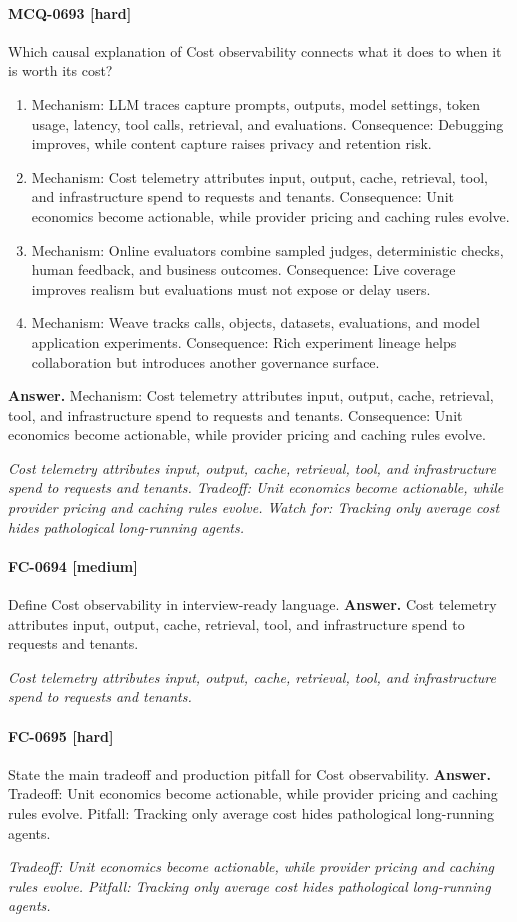 \paragraph{MCQ-0693 [hard]} Which causal explanation of Cost observability connects what it does to when it is worth its cost?
\begin{enumerate}[label=\Alph*.]
\item Mechanism: LLM traces capture prompts, outputs, model settings, token usage, latency, tool calls, retrieval, and evaluations. Consequence: Debugging improves, while content capture raises privacy and retention risk.
\item Mechanism: Cost telemetry attributes input, output, cache, retrieval, tool, and infrastructure spend to requests and tenants. Consequence: Unit economics become actionable, while provider pricing and caching rules evolve.
\item Mechanism: Online evaluators combine sampled judges, deterministic checks, human feedback, and business outcomes. Consequence: Live coverage improves realism but evaluations must not expose or delay users.
\item Mechanism: Weave tracks calls, objects, datasets, evaluations, and model application experiments. Consequence: Rich experiment lineage helps collaboration but introduces another governance surface.
\end{enumerate}
\noindent\textbf{Answer.} Mechanism: Cost telemetry attributes input, output, cache, retrieval, tool, and infrastructure spend to requests and tenants. Consequence: Unit economics become actionable, while provider pricing and caching rules evolve.
\par\textit{Cost telemetry attributes input, output, cache, retrieval, tool, and infrastructure spend to requests and tenants. Tradeoff: Unit economics become actionable, while provider pricing and caching rules evolve. Watch for: Tracking only average cost hides pathological long-running agents.}
\paragraph{FC-0694 [medium]} Define Cost observability in interview-ready language.
\noindent\textbf{Answer.} Cost telemetry attributes input, output, cache, retrieval, tool, and infrastructure spend to requests and tenants.
\par\textit{Cost telemetry attributes input, output, cache, retrieval, tool, and infrastructure spend to requests and tenants.}
\paragraph{FC-0695 [hard]} State the main tradeoff and production pitfall for Cost observability.
\noindent\textbf{Answer.} Tradeoff: Unit economics become actionable, while provider pricing and caching rules evolve. Pitfall: Tracking only average cost hides pathological long-running agents.
\par\textit{Tradeoff: Unit economics become actionable, while provider pricing and caching rules evolve. Pitfall: Tracking only average cost hides pathological long-running agents.}
